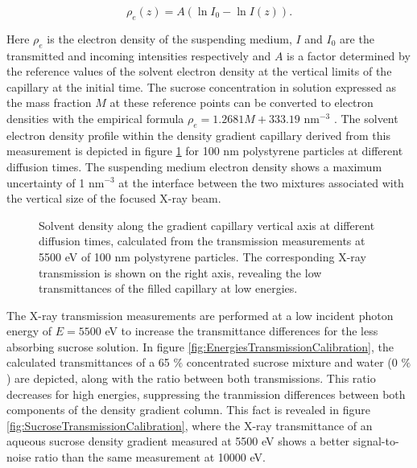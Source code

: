 \begin{equation}
  \rho_e(z) = A \left( \ln{I_0} - \ln{I(z)} \right) .
\end{equation}

Here \(\rho_e\) is the electron density of the suspending medium, $I$ and $I_0$ are the transmitted and incoming intensities respectively and $A$ is a factor determined by the reference values of the solvent electron density at the vertical limits of the capillary at the initial time. The sucrose concentration in solution expressed as the mass fraction \( M \) at these reference points can be converted to electron densities with the empirical formula \( \rho_e=1.2681M+333.19 \) nm\(^{-3}\) \citep{haynes_crc_2012}. The solvent electron density profile within the density gradient capillary derived from this measurement is depicted in figure \ref{fig:KiskerTransmissionCalibration} for 100 nm polystyrene particles at different diffusion times. The suspending medium electron density shows a maximum uncertainty of 1 nm$^{-3}$ at the interface between the two mixtures associated with the vertical size of the focused X-ray beam.

\begin{figure}%
	\centering
		
		\caption[Calibration of the solvent electron density by X-ray transmission]{Solvent density along the gradient capillary vertical axis at different diffusion times, calculated from the transmission measurements at 5500 eV of 100 nm polystyrene particles. The corresponding X-ray transmission is shown on the right axis, revealing the low transmittances of the filled capillary at low energies.}
		\label{fig:KiskerTransmissionCalibration}
\end{figure}

The X-ray transmission measurements are performed at a low incident photon energy of $E = 5500$ eV to increase the transmittance differences for the less absorbing sucrose solution. In figure \ref{fig:EnergiesTransmissionCalibration}, the calculated transmittances of a 65 $\%$ concentrated sucrose mixture and water (0 $\%$) are depicted, along with the ratio between both transmissions. This ratio decreases for high energies, suppressing the tranmission differences between both components of the density gradient column. This fact is revealed in figure \ref{fig:SucroseTransmissionCalibration}, where the X-ray transmittance of an aqueous sucrose density gradient measured at 5500 eV shows a better signal-to-noise ratio than the same measurement at 10000 eV.

